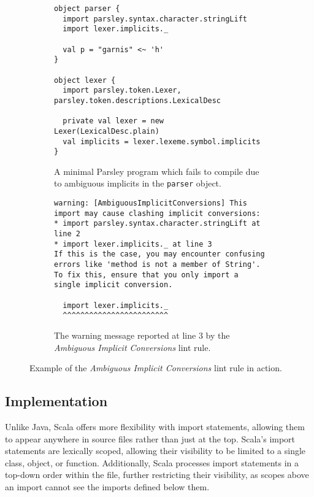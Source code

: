 \documentclass[../../main.tex]{subfiles}
\begin{document}
\begin{figure}[htbp]
\begin{subfigure}{\textwidth}
\begin{verbatim}
object parser {
  import parsley.syntax.character.stringLift
  import lexer.implicits._

  val p = "garnis" <~ 'h'
}

object lexer {
  import parsley.token.Lexer, parsley.token.descriptions.LexicalDesc

  private val lexer = new Lexer(LexicalDesc.plain)
  val implicits = lexer.lexeme.symbol.implicits
}
\end{verbatim}
\caption{A minimal Parsley program which fails to compile due to ambiguous implicits in the \texttt{parser} object.}
\label{fig:ambiguous-implicits-example}
\end{subfigure}
%
\begin{subfigure}{\textwidth}
\vspace{3ex} %
\begin{verbatim}
warning: [AmbiguousImplicitConversions] This import may cause clashing implicit conversions:
* import parsley.syntax.character.stringLift at line 2
* import lexer.implicits._ at line 3
If this is the case, you may encounter confusing errors like 'method is not a member of String'.
To fix this, ensure that you only import a single implicit conversion.

  import lexer.implicits._
  ^^^^^^^^^^^^^^^^^^^^^^^^  
\end{verbatim}
\caption{The warning message reported at line 3 by the \emph{Ambiguous Implicit Conversions} lint rule.}
\label{fig:ambiguous-implicits-warning}
\end{subfigure}
\caption{Example of the \emph{Ambiguous Implicit Conversions} lint rule in action.}
\end{figure}

\subsection*{Implementation}
Unlike Java, Scala offers more flexibility with import statements, allowing them to appear anywhere in source files rather than just at the top.
Scala's import statements are lexically scoped, allowing their visibility to be limited to a single class, object, or function.
Additionally, Scala processes import statements in a top-down order within the file, further restricting their visibility, as scopes above an import cannot see the imports defined below them.
\end{document}
